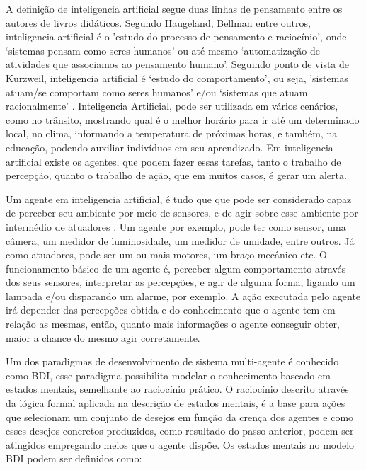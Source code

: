\documentclass[12pt]{article}
\begin{document}
    \medskip
    A definição de inteligencia artificial segue duas linhas de pensamento entre os autores de
    livros didáticos. Segundo Haugeland, Bellman entre outros, inteligencia artificial é o 'estudo
    do processo de pensamento e raciocínio', onde `sistemas pensam como seres humanos' ou até mesmo
    `automatização de atividades que associamos ao pensamento humano'. Seguindo ponto de vista de
    Kurzweil, inteligencia artificial é `estudo do comportamento', ou seja, 'sistemas atuam/se
    comportam como seres humanos' e/ou `sistemas que atuam racionalmente' \cite{livro_IA_BU}.
    Inteligencia Artificial, pode ser utilizada em vários cenários, como no trânsito, mostrando qual
    é o melhor horário para ir até um determinado local, no clima, informando a temperatura de
    próximas horas, e também, na educação, podendo auxiliar indivíduos em seu aprendizado. Em
    inteligencia artificial existe os agentes, que podem fazer essas tarefas, tanto o trabalho de
    percepção, quanto o trabalho de ação, que em muitos casos, é gerar um alerta.

    \medskip
    Um agente em inteligencia artificial, é tudo que que pode ser considerado capaz de perceber seu
    ambiente por meio de sensores, e de agir sobre esse ambiente por intermédio de atuadores
    \cite{livro_IA_BU}. Um agente por exemplo, pode ter como sensor, uma câmera, um medidor de
    luminosidade, um medidor de umidade, entre outros. Já como atuadores, pode ser um ou mais motores,
    um braço mecânico etc. O funcionamento básico de um agente é, perceber algum comportamento através
    dos seus sensores, interpretar as percepções, e agir de alguma forma, ligando um lampada e/ou
    disparando um alarme, por exemplo. A ação executada pelo agente irá depender das percepções obtida
    e do conhecimento que o agente tem em relação as mesmas, então, quanto mais informações o agente
    conseguir obter, maior a chance do mesmo agir corretamente.

    \medskip
    Um dos paradigmas de desenvolvimento de sistema multi-agente é conhecido como BDI, esse paradigma
    possibilita modelar o conhecimento baseado em estados mentais, semelhante ao raciocínio prático. O
    raciocínio descrito através da lógica formal aplicada na descrição de estados mentais, é a base
    para ações que selecionam um conjunto de desejos em função da crença dos agentes e como esses
    desejos concretos produzidos, como resultado do passo anterior, podem ser atingidos empregando
    meios que o agente dispõe. Os estados mentais no modelo BDI podem ser definidos como:
    \cite{livro_IA_BU}
\end{document}

